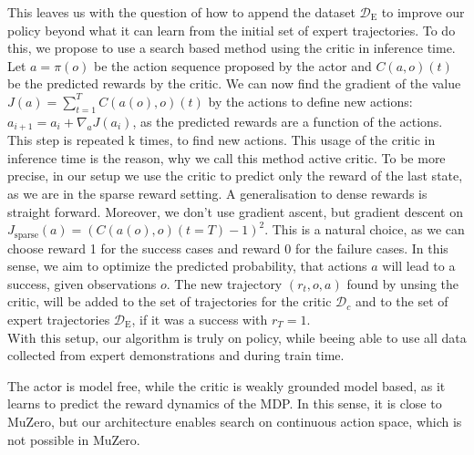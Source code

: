 This leaves us with the question of how to append the dataset $\mathcal{D}_{\text{E}}$ to improve our policy beyond what it can learn from the 
initial set of expert trajectories. To do this, we propose to use 
a search based method using the critic in inference time. Let $a = \pi(o)$ be the action sequence proposed by the actor and $C(a, o)(t)$ be the predicted rewards by the critic. 
We can now find the gradient of the value $J(a) = \sum_{t=1}^{T} C(a(o), o)(t)$ by the actions to define new actions: $a_{i+1} = a_i + \nabla_{a} J(a_i)$, as the predicted rewards are a 
function of the actions. This step is repeated k times, to find new actions. This usage of the critic in inference time 
is the reason, why we call this method active critic. To be more precise, in our setup we use the critic to predict only the reward of the last state, as we are 
in the sparse reward setting. A generalisation to dense rewards is straight forward. Moreover, we don't use gradient ascent, but gradient descent on 
$J_{\text{sparse}}(a) =  (C(a(o), o)(t=T)- 1)^2$. This is a natural choice, as we can 
choose reward 1 for the success cases and reward 0 for the failure cases. In this sense, we aim to optimize the predicted probability, that actions $a$ will lead 
to a success, given observations $o$. The new trajectory $(r_t, o, a)$ found by unsing the critic, will 
be added to the set of trajectories for the critic $\mathcal{D}_c$ and to the set of expert trajectories $\mathcal{D}_{\text{E}}$, if it was a success with $r_T = 1$. \\
With this setup, our algorithm is truly on policy, while beeing able to use all data collected from expert demonstrations and during train time. 

The actor is model free, while the critic is weakly grounded model based, as it learns to predict the reward dynamics of the MDP. In this sense, it is close to MuZero, 
but our architecture enables search on continuous action space, which is not possible in MuZero. 

